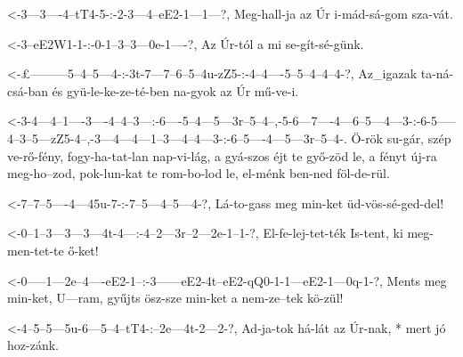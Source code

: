 

  {<-3---3----4--tT4-5-:-2-3---4--eE2-1---1---?,}
  {  Meg-hall-ja az  Úr  i-mád-sá-gom sza-vát.}

  {<-3--eE2W1-1-:-0-1--3--3---0e-1----?,}
  {  Az Úr-tól    a mi se-gít-sé-günk.}


  {<-£---------5--4--5---4-:-3t-7---7--6--5--4u-zZ5-:-4--4----5--5--4--4--4-?,}
  {  Az_igazak ta-ná-csá-ban és gyü-le-ke-ze-té-ben   na-gyok az Úr mű-ve-i.}



  {<-3-4---4--1----3----4--4--3---:-6----5--4---5---3r--5--4--,-5-6---7----4---6--5---4---3-:-6-5-----4--3--5---zZ5-4--,-3---4---4---1--3---4--4---3-:-6--5----4---5---3r--5--4-.}
  {  Ö-rök su-gár, szép ve-rő-fény, fogy-ha-tat-lan nap-vi-lág, a gyá-szos éjt te győ-zöd le, a fényt új-ra meg-ho--zod, pok-lun-kat te rom-bo-lod le, el-ménk ben-ned föl-de-rül.}

  {<-7--7--5----4---45u-7-:-7--5---4--5---4-?,}
  {  Lá-to-gass meg min-ket üd-vös-sé-ged-del!}

  {<-0--1--3---3---3---4t-4---:-4--2---3r--2---2e-1--1-?,}
  {  El-fe-lej-tet-ték Is-tent, ki meg-men-tet-te ő-ket!}

  {<-0-----1---2e--4----eE2-1--:-3------eE2-4t--eE2-qQ0-1-1---eE2-1---0q-1-?,}
  {  Ments meg min-ket, U---ram, gyűjts ösz-sze min-ket a nem-ze--tek kö-zül!}

  {<-4--5--5---5u-6---5--4--tT4-:--2e---4t-2---2-?,}
  {  Ad-ja-tok há-lát az Úr-nak, * mert jó hoz-zánk.}

